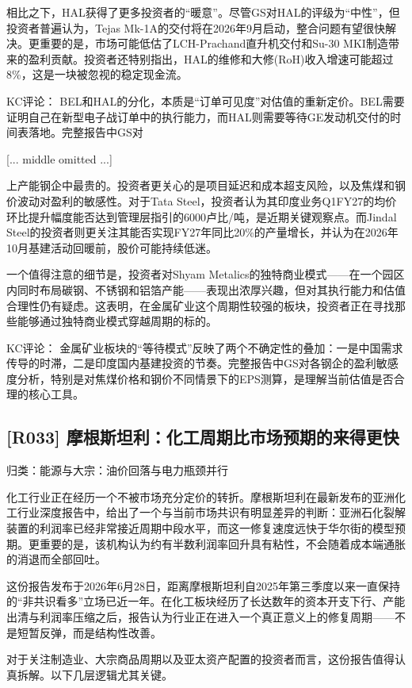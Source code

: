 \documentclass[11pt]{ctexart}
\begin{document}
相比之下，HAL获得了更多投资者的“暖意”。尽管GS对HAL的评级为“中性”，但投资者普遍认为，Tejas Mk-1A的交付将在2026年9月启动，整合问题有望很快解决。更重要的是，市场可能低估了LCH-Prachand直升机交付和Su-30 MKI制造带来的盈利贡献。投资者还特别指出，HAL的维修和大修(RoH)收入增速可能超过8\%，这是一块被忽视的稳定现金流。

KC评论： BEL和HAL的分化，本质是“订单可见度”对估值的重新定价。BEL需要证明自己在新型电子战订单中的执行能力，而HAL则需要等待GE发动机交付的时间表落地。完整报告中GS对

[... middle omitted ...]

上产能钢企中最贵的。投资者更关心的是项目延迟和成本超支风险，以及焦煤和钢价波动对盈利的敏感性。对于Tata Steel，投资者认为其印度业务Q1FY27的均价环比提升幅度能否达到管理层指引的6000卢比/吨，是近期关键观察点。而Jindal Steel的投资者则更关注其能否实现FY27年同比20\%的产量增长，并认为在2026年10月基建活动回暖前，股价可能持续低迷。

一个值得注意的细节是，投资者对Shyam Metalics的独特商业模式——在一个园区内同时布局碳钢、不锈钢和铝箔产能——表现出浓厚兴趣，但对其执行能力和估值合理性仍有疑虑。这表明，在金属矿业这个周期性较强的板块，投资者正在寻找那些能够通过独特商业模式穿越周期的标的。

KC评论： 金属矿业板块的“等待模式”反映了两个不确定性的叠加：一是中国需求传导的时滞，二是印度国内基建投资的节奏。完整报告中GS对各钢企的盈利敏感度分析，特别是对焦煤价格和钢价不同情景下的EPS测算，是理解当前估值是否合理的核心工具。

\subsection{[R033] 摩根斯坦利：化工周期比市场预期的来得更快}
{\small\color{refgray}归类：能源与大宗：油价回落与电力瓶颈并行}

化工行业正在经历一个不被市场充分定价的转折。摩根斯坦利在最新发布的亚洲化工行业深度报告中，给出了一个与当前市场共识有明显差异的判断：亚洲石化裂解装置的利润率已经非常接近周期中段水平，而这一修复速度远快于华尔街的模型预期。更重要的是，该机构认为约有半数利润率回升具有粘性，不会随着成本端通胀的消退而全部回吐。

这份报告发布于2026年6月28日，距离摩根斯坦利自2025年第三季度以来一直保持的“非共识看多”立场已近一年。在化工板块经历了长达数年的资本开支下行、产能出清与利润率压缩之后，报告认为行业正在进入一个真正意义上的修复周期——不是短暂反弹，而是结构性改善。

对于关注制造业、大宗商品周期以及亚太资产配置的投资者而言，这份报告值得认真拆解。以下几层逻辑尤其关键。
\end{document}
